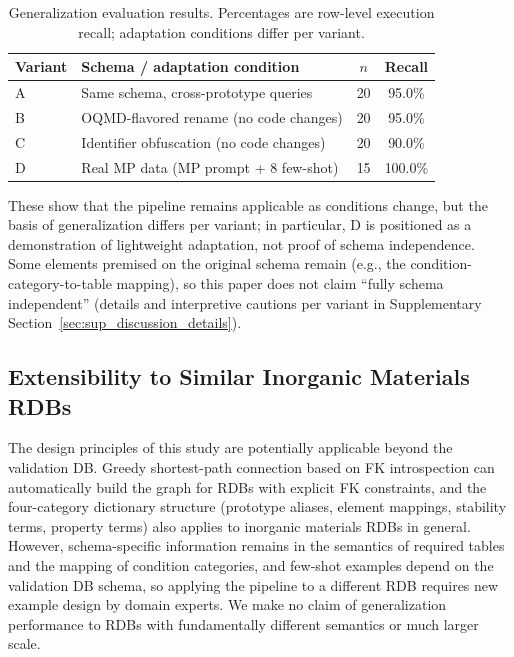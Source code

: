 \begin{table}[t]
\centering
\caption{Generalization evaluation results. Percentages are row-level execution recall; adaptation conditions differ per variant.}
\label{tab:transfer_eval}
\footnotesize
\begin{tabular}{@{}lp{11.5em}cc@{}}
\toprule
Variant & Schema / adaptation condition & $n$ & Recall \\ \midrule
A & Same schema, cross-prototype queries & 20 & 95.0\% \\
B & OQMD-flavored rename (no code changes) & 20 & 95.0\% \\
C & Identifier obfuscation (no code changes) & 20 & 90.0\% \\
D & Real MP data (MP prompt + 8 few-shot) & 15 & 100.0\% \\
\bottomrule
\end{tabular}
\end{table}

These show that the pipeline remains applicable as conditions change, but the basis of generalization differs per variant; in particular, D is positioned as a demonstration of lightweight adaptation, not proof of schema independence. Some elements premised on the original schema remain (e.g., the condition-category-to-table mapping), so this paper does not claim ``fully schema independent'' (details and interpretive cautions per variant in Supplementary Section~\ref{sec:sup_discussion_details}).

\subsection{Extensibility to Similar Inorganic Materials RDBs}
\label{sec:extensibility}

The design principles of this study are potentially applicable beyond the validation DB. Greedy shortest-path connection based on FK introspection can automatically build the graph for RDBs with explicit FK constraints, and the four-category dictionary structure (prototype aliases, element mappings, stability terms, property terms) also applies to inorganic materials RDBs in general. However, schema-specific information remains in the semantics of required tables and the mapping of condition categories, and few-shot examples depend on the validation DB schema, so applying the pipeline to a different RDB requires new example design by domain experts. We make no claim of generalization performance to RDBs with fundamentally different semantics or much larger scale.

